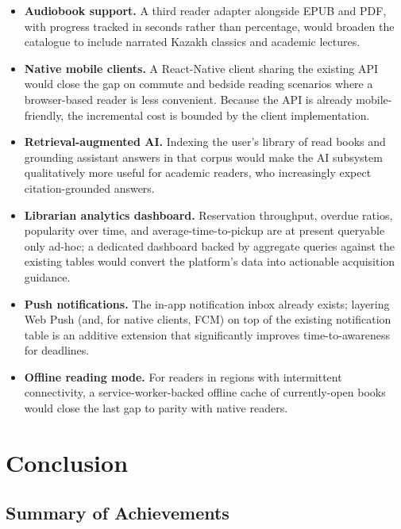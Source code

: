 \documentclass[12pt,a4paper]{report}
\begin{document}
\begin{itemize}[leftmargin=*]
    \item \textbf{Audiobook support.} A third reader adapter alongside
    EPUB and PDF, with progress tracked in seconds rather than
    percentage, would broaden the catalogue to include narrated
    Kazakh classics and academic lectures.
    \item \textbf{Native mobile clients.} A React-Native client
    sharing the existing API would close the gap on commute and
    bedside reading scenarios where a browser-based reader is less
    convenient. Because the API is already mobile-friendly, the
    incremental cost is bounded by the client implementation.
    \item \textbf{Retrieval-augmented AI.} Indexing the user's
    library of read books and grounding assistant answers in that
    corpus would make the AI subsystem qualitatively more useful for
    academic readers, who increasingly expect citation-grounded
    answers.
    \item \textbf{Librarian analytics dashboard.} Reservation
    throughput, overdue ratios, popularity over time, and
    average-time-to-pickup are at present queryable only ad-hoc; a
    dedicated dashboard backed by aggregate queries against the
    existing tables would convert the platform's data into
    actionable acquisition guidance.
    \item \textbf{Push notifications.} The in-app notification inbox
    already exists; layering Web Push (and, for native clients, FCM)
    on top of the existing notification table is an additive
    extension that significantly improves time-to-awareness for
    deadlines.
    \item \textbf{Offline reading mode.} For readers in regions with
    intermittent connectivity, a service-worker-backed offline
    cache of currently-open books would close the last gap to
    parity with native readers.
\end{itemize}

\chapter{Conclusion}

\section{Summary of Achievements}
\end{document}
